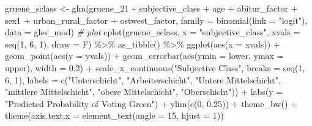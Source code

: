 \documentclass[
]{article}
\newenvironment{Shaded}{\begin{snugshade}}{\end{snugshade}}
\newcommand{\AttributeTok}[1]{\textcolor[rgb]{0.77,0.63,0.00}{#1}}
\newcommand{\CommentTok}[1]{\textcolor[rgb]{0.56,0.35,0.01}{\textit{#1}}}
\newcommand{\DecValTok}[1]{\textcolor[rgb]{0.00,0.00,0.81}{#1}}
\newcommand{\FloatTok}[1]{\textcolor[rgb]{0.00,0.00,0.81}{#1}}
\newcommand{\FunctionTok}[1]{\textcolor[rgb]{0.00,0.00,0.00}{#1}}
\newcommand{\NormalTok}[1]{#1}
\newcommand{\OtherTok}[1]{\textcolor[rgb]{0.56,0.35,0.01}{#1}}
\newcommand{\SpecialCharTok}[1]{\textcolor[rgb]{0.00,0.00,0.00}{#1}}
\newcommand{\StringTok}[1]{\textcolor[rgb]{0.31,0.60,0.02}{#1}}
\begin{document}
\begin{Shaded}
\begin{Highlighting}[]
\NormalTok{gruene\_sclass }\OtherTok{\textless{}{-}} \FunctionTok{glm}\NormalTok{(gruene\_21 }\SpecialCharTok{\textasciitilde{}}\NormalTok{ subjective\_class }\SpecialCharTok{+}\NormalTok{ age }\SpecialCharTok{+}\NormalTok{ abitur\_factor }\SpecialCharTok{+}\NormalTok{ sex1 }\SpecialCharTok{+}\NormalTok{ urban\_rural\_factor }\SpecialCharTok{+}\NormalTok{ ostwest\_factor, }\AttributeTok{family =} \FunctionTok{binomial}\NormalTok{(}\AttributeTok{link =} \StringTok{"logit"}\NormalTok{), }\AttributeTok{data =}\NormalTok{ gles\_mod)}
\CommentTok{\# plot }
\FunctionTok{cplot}\NormalTok{(gruene\_sclass, }\AttributeTok{x =} \StringTok{"subjective\_class"}\NormalTok{, }
      \AttributeTok{xvals =} \FunctionTok{seq}\NormalTok{(}\DecValTok{1}\NormalTok{, }\DecValTok{6}\NormalTok{, }\DecValTok{1}\NormalTok{),}
      \AttributeTok{draw =}\NormalTok{ F) }\SpecialCharTok{\%\textgreater{}\%}
  \FunctionTok{as\_tibble}\NormalTok{() }\SpecialCharTok{\%\textgreater{}\%}
  \FunctionTok{ggplot}\NormalTok{(}\FunctionTok{aes}\NormalTok{(}\AttributeTok{x =}\NormalTok{ xvals)) }\SpecialCharTok{+}
  \FunctionTok{geom\_point}\NormalTok{(}\FunctionTok{aes}\NormalTok{(}\AttributeTok{y =}\NormalTok{ yvals)) }\SpecialCharTok{+}
  \FunctionTok{geom\_errorbar}\NormalTok{(}\FunctionTok{aes}\NormalTok{(}\AttributeTok{ymin =}\NormalTok{ lower, }\AttributeTok{ymax =}\NormalTok{ upper), }\AttributeTok{width =} \FloatTok{0.2}\NormalTok{) }\SpecialCharTok{+}
  \FunctionTok{scale\_x\_continuous}\NormalTok{(}\StringTok{"Subjective Class"}\NormalTok{, }
                     \AttributeTok{breaks =} \FunctionTok{seq}\NormalTok{(}\DecValTok{1}\NormalTok{, }\DecValTok{6}\NormalTok{, }\DecValTok{1}\NormalTok{), }
                     \AttributeTok{labels =} \FunctionTok{c}\NormalTok{(}\StringTok{"Unterschicht"}\NormalTok{, }\StringTok{"Arbeiterschicht"}\NormalTok{, }
                                \StringTok{"Untere Mittelschicht"}\NormalTok{, }\StringTok{"mittlere Mittelschicht"}\NormalTok{, }\StringTok{"obere Mittelschicht"}\NormalTok{, }\StringTok{"Oberschicht"}\NormalTok{)) }\SpecialCharTok{+}
  \FunctionTok{labs}\NormalTok{(}\AttributeTok{y =} \StringTok{"Predicted Probability of Voting Green"}\NormalTok{) }\SpecialCharTok{+}
  \FunctionTok{ylim}\NormalTok{(}\FunctionTok{c}\NormalTok{(}\DecValTok{0}\NormalTok{, }\FloatTok{0.25}\NormalTok{)) }\SpecialCharTok{+}
  \FunctionTok{theme\_bw}\NormalTok{() }\SpecialCharTok{+}
  \FunctionTok{theme}\NormalTok{(}\AttributeTok{axis.text.x =} \FunctionTok{element\_text}\NormalTok{(}\AttributeTok{angle =} \DecValTok{15}\NormalTok{, }\AttributeTok{hjust =} \DecValTok{1}\NormalTok{))}
\end{Highlighting}
\end{Shaded}
\end{document}

